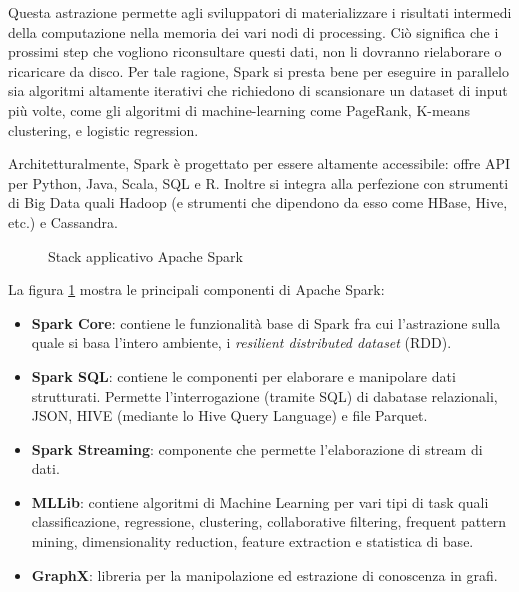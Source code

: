 Questa astrazione permette agli sviluppatori di materializzare i risultati intermedi della computazione nella memoria dei vari nodi di processing. Ciò significa che i prossimi step che vogliono riconsultare questi dati, non li dovranno rielaborare o ricaricare da
disco. Per tale ragione, Spark  si presta bene per eseguire in parallelo sia algoritmi altamente iterativi che richiedono di scansionare un dataset di input
più volte, come gli algoritmi di machine-learning come   PageRank, K-means clustering, e logistic regression.




Architetturalmente, Spark è progettato per essere altamente accessibile: offre API per Python, Java, Scala, SQL e R. Inoltre si integra alla perfezione con strumenti di Big Data quali Hadoop (e strumenti che dipendono da esso come HBase, Hive, etc.) e Cassandra.




 
\begin{figure}[htbp]
    \caption{Stack applicativo Apache Spark}
    \label{fig:sparkstack}
\end{figure}




La figura \ref{fig:sparkstack} mostra le principali componenti di Apache Spark:
\begin{itemize}
\item \textbf{Spark Core}: contiene le funzionalità base di Spark fra cui l'astrazione sulla quale si basa l'intero ambiente, i \textit{resilient distributed dataset} (RDD).
\item \textbf{Spark SQL}: contiene le componenti per elaborare e manipolare dati strutturati. Permette l'interrogazione (tramite SQL) di dabatase relazionali, JSON, HIVE (mediante lo Hive Query Language) e file Parquet. 
\item \textbf{Spark Streaming}: componente che permette l'elaborazione di stream di dati.
\item \textbf{MLLib}: contiene algoritmi di Machine Learning per vari tipi di task quali classificazione, regressione, clustering, collaborative filtering, frequent pattern mining, dimensionality reduction, feature extraction e statistica di base.
\item \textbf{GraphX}: libreria per la manipolazione ed estrazione di conoscenza in grafi.
\end{itemize}

